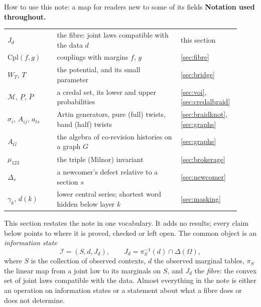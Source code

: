 \documentclass[11pt]{article}
\theoremstyle{definition}\newtheorem{definition}[theorem]{Definition}\newtheorem{remark}[theorem]{Remark}\newtheorem{example}[theorem]{Example}\newtheorem{problem}[theorem]{Open problem}\crefname{problem}{Problem}{Problems}
\begin{document}
\begin{mapbox}{How to use this note: a map for readers new to some of its fields}
\textbf{Notation used throughout.}\par
\begin{tabular}{@{}>{\raggedright\arraybackslash}p{0.2\linewidth}>{\raggedright\arraybackslash}p{0.5\linewidth}>{\raggedright\arraybackslash}p{0.22\linewidth}@{}}
$J_d$ & the fibre: joint laws compatible with the data $d$ & this section\\
$\mathrm{Cpl}(f,g)$ & couplings with margins $f$, $g$ & \cref{sec:fibre}\\
$W_T$, $T$ & the potential, and its small parameter & \cref{sec:bridge}\\
$\mathcal M$, $\underline P$, $\overline P$ & a credal set, its lower and upper probabilities & \cref{sec:voi}, \cref{sec:credalbraid}\\
$\sigma_i$, $A_{ij}$, $a_{ts}$ & Artin generators, pure (full) twists, band (half) twists & \cref{sec:braidknot}, \cref{sec:graphs}\\
$A_G$ & the algebra of co-revision histories on a graph $G$ & \cref{sec:graphs}\\
$\mu_{123}$ & the triple (Milnor) invariant & \cref{sec:brokerage}\\
$\Delta_s$ & a newcomer's defect relative to a section $s$ & \cref{sec:newcomer}\\
$\gamma_k$, $d(k)$ & lower central series; shortest word hidden below layer $k$ & \cref{sec:masking}\\
\end{tabular}
\end{mapbox}
This section restates the note in one vocabulary. It adds no results; every claim below points to where it is proved, checked or left open. The common object is an \emph{information state}
\[
\mathcal I=(S,d,J_d),\qquad J_d=\pi_S^{-1}(d)\cap\Delta(\Omega),
\]
where $S$ is the collection of observed contexts, $d$ the observed marginal tables, $\pi_S$ the linear map from a joint law to its marginals on $S$, and $J_d$ the \emph{fibre}: the convex set of joint laws compatible with the data. Almost everything in the note is either an operation on information states or a statement about what a fibre does or does not determine.
\end{document}
